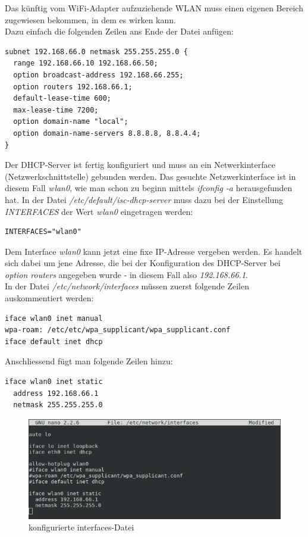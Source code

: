 Das künftig vom WiFi-Adapter aufzuziehende WLAN muss einen eigenen Bereich zugewiesen bekommen, in dem es wirken kann.
\\
Dazu einfach die folgenden Zeilen ans Ende der Datei anfügen:

\begin{lstlisting}
subnet 192.168.66.0 netmask 255.255.255.0 {
  range 192.168.66.10 192.168.66.50;
  option broadcast-address 192.168.66.255;
  option routers 192.168.66.1;
  default-lease-time 600;
  max-lease-time 7200;
  option domain-name "local";
  option domain-name-servers 8.8.8.8, 8.8.4.4;
}
\end{lstlisting}

Der DHCP-Server ist fertig konfiguriert und muss an ein Netwerkinterface (Netzwerkschnittstelle) gebunden werden. Das gesuchte Netzwerkinterface ist in diesem Fall \textit{wlan0}, wie man schon zu beginn mittels \textit{ifconfig -a} herausgefunden hat.
In der Datei \textit{/etc/default/isc-dhcp-server} muss dazu bei der Einstellung \textit{INTERFACES} der Wert \textit{wlan0} eingetragen werden:

\begin{lstlisting}
INTERFACES="wlan0"
\end{lstlisting}

Dem Interface \textit{wlan0} kann jetzt eine fixe IP-Adresse vergeben werden. Es handelt sich dabei um jene Adresse, die bei der Konfiguration des DHCP-Server bei \textit{option routers} angegeben wurde - in diesem Fall also \textit{192.168.66.1}. 
\\
In der Datei \textit{/etc/network/interfaces} müssen zuerst folgende Zeilen auskommentiert werden:

\begin{lstlisting}
iface wlan0 inet manual
wpa-roam: /etc/etc/wpa_supplicant/wpa_supplicant.conf
iface default inet dhcp
\end{lstlisting}

Anschliessend fügt man folgende Zeilen hinzu:

\begin{lstlisting}
iface wlan0 inet static
  address 192.168.66.1
  netmask 255.255.255.0
\end{lstlisting}

\begin{figure}[H]
\centering
\includegraphics[scale=0.65]{images/network_interfaces.png}
\caption{konfigurierte interfaces-Datei}
\end{figure}

